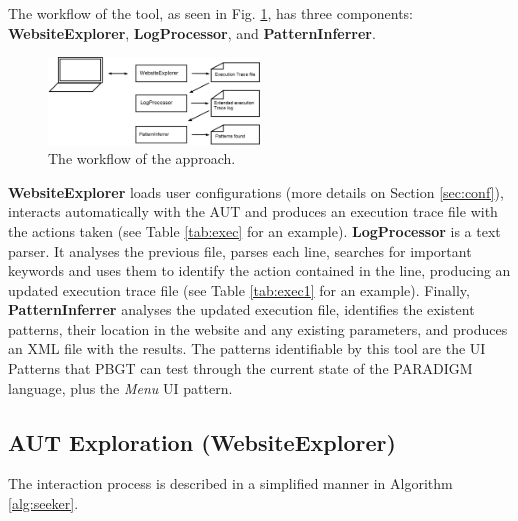 \documentclass[10pt, conference, compsocconf]{IEEEtran}
\begin{document}
The workflow of the tool, as seen in Fig. \ref{fig:retool}, has three components: \textbf{WebsiteExplorer}, \textbf{LogProcessor}, and \textbf{PatternInferrer}.

\begin{figure}[!htb]
\centering
\includegraphics[width=0.5\textwidth]{retool} 
\caption{The workflow of the approach.}
\label{fig:retool}
\end{figure}

\textbf{WebsiteExplorer} loads user configurations (more details on Section \ref{sec:conf}), interacts automatically with the AUT and produces an execution trace file with the actions taken (see Table \ref{tab:exec} for an example). \textbf{LogProcessor} is a text parser. It analyses the previous file, parses each line, searches for important keywords and uses them to identify the action contained in the line, producing an updated execution trace file (see Table \ref{tab:exec1} for an example). Finally, \textbf{PatternInferrer} analyses the updated execution file, identifies the existent patterns, their location in the website and any existing parameters, and produces an XML file with the results. The patterns identifiable by this tool are the UI Patterns that PBGT can test through the current state of the PARADIGM language, plus the \textit{Menu} UI pattern. 

\subsection{AUT Exploration (WebsiteExplorer)}\label{sec:inter}
The interaction process is described in a simplified manner in Algorithm \ref{alg:seeker}.
\end{document}
